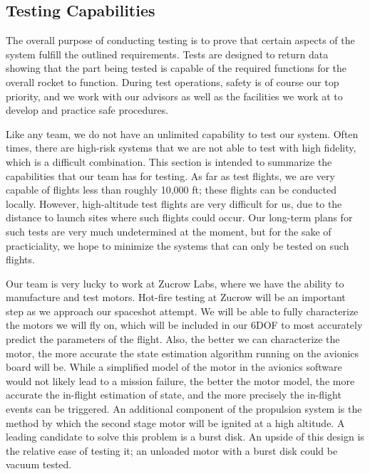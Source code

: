 \subsection{Testing Capabilities}
The overall purpose of conducting testing is to prove that certain aspects of the system fulfill the outlined requirements. Tests are designed to return data showing that the part being tested is capable of the required functions for the overall rocket to function. During test operations, safety is of course our top priority, and we work with our advisors as well as the facilities we work at to develop and practice safe procedures.

Like any team, we do not have an unlimited capability to test our system. Often times, there are high-risk systems that we are not able to test with high fidelity, which is a difficult combination. This section is intended to summarize the capabilities that our team has for testing. As far as test flights, we are very capable of flights less than roughly 10,000 ft; these flights can be conducted locally. However, high-altitude test flights are very difficult for us, due to the distance to launch sites where such flights could occur. Our long-term plans for such tests are very much undetermined at the moment, but for the sake of practiciality, we hope to minimize the systems that can only be tested on such flights.

Our team is very lucky to work at Zucrow Labs, where we have the ability to manufacture and test motors. Hot-fire testing at Zucrow will be an important step as we approach our spaceshot attempt. We will be able to fully characterize the motors we will fly on, which will be included in our 6DOF to most accurately predict the parameters of the flight. Also, the better we can characterize the motor, the more accurate the state estimation algorithm running on the avionics board will be. While a simplified model of the motor in the avionics software would not likely lead to a mission failure, the better the motor model, the more accurate the in-flight estimation of state, and the more precisely the in-flight events can be triggered. An additional component of the propulsion system is the method by which the second stage motor will be ignited at a high altitude. A leading candidate to solve this problem is a burst disk. An upside of this design is the relative ease of testing it; an unloaded motor with a burst disk could be vacuum tested.

